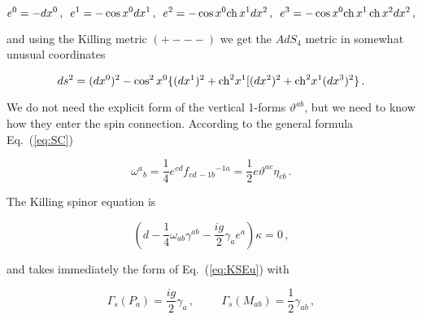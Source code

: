 \documentclass[12pt,a4paper]{article}
\begin{document}

\begin{equation}
e^{0} = -dx^{0}\, ,\,\,\,
e^{1} = -\cos{x^{0}}dx^{1}\, ,\,\,\,
e^{2} = -\cos{x^{0}}{\rm ch}\, x^{1}dx^{2}\, ,\,\,\,
e^{3} = -\cos{x^{0}}{\rm ch}\, x^{1}\, {\rm ch}\, x^{2}dx^{2}\, ,
\end{equation}

\noindent 
and using the Killing metric $(+---)$ we get the $AdS_{4}$ metric 
in somewhat unusual coordinates

\begin{equation}
ds^{2}= (dx^{0})^{2} -\cos^{2}x^{0}\{(dx^{1})^{2} +{\rm ch}^{2}x^{1}
[(dx^{2})^{2} +{\rm ch}^{2}x^{1} (dx^{3})^{2}\}\, .
\end{equation}

We do not need the explicit form of the vertical 1-forms
$\vartheta^{ab}$, but we need to know how they enter the spin
connection. According to the general formula Eq.~(\ref{eq:SC})

\begin{equation}
 \omega^{a}{}_{b} = {\textstyle\frac{1}{4}}e^{cd}f_{cd\, -1b}{}^{-1a}=
 {\textstyle\frac{1}{2}}e\vartheta^{ac}\eta_{cb}\, . 
\end{equation}

The Killing spinor equation is

\begin{equation}
(d -{\textstyle\frac{1}{4}}\omega_{ab}\gamma^{ab} 
-{\textstyle\frac{ig}{2}}\gamma_{a}e^{a}) \kappa=0\, ,  
\end{equation}

\noindent 
and takes immediately the form of Eq.~(\ref{eq:KSEu}) with

\begin{equation}
\Gamma_{s}(P_{a}) = {\textstyle\frac{ig}{2}}\gamma_{a}\, ,
\hspace{1cm}
\Gamma_{s}(M_{ab}) = {\textstyle\frac{1}{2}}\gamma_{ab}\, ,
\end{equation}
\end{document}
